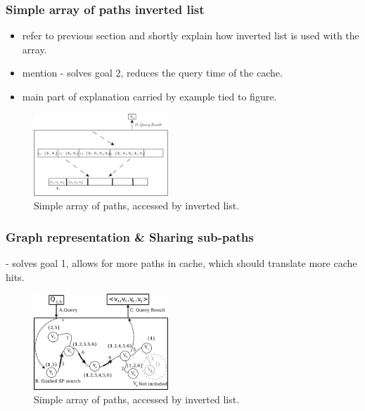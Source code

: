 \subsubsection{Simple array of paths inverted list}

\begin{itemize}
\item refer to previous section and shortly explain how inverted list is used with the array.
\item mention  - solves goal 2, reduces the query time of the cache.
\item main part of explanation carried by example tied to figure.
\end{itemize}

\begin{figure}[hbt]
  \center
        \includegraphics[width=0.45\textwidth]{figures/cachearrayinvertlist.pdf}
        \caption{Simple array of paths, accessed by inverted list.}
  \label{fig:cacheinvertlist}
\end{figure}


\subsubsection{Graph representation \& Sharing sub-paths} - solves goal 1, allows for more paths in cache, which should translate more cache hits.

\begin{figure}[hbt]
  \center
        \includegraphics[width=0.45\textwidth]{figures/cachegraph}
        \caption{Simple array of paths, accessed by inverted list.}
  \label{fig:cachegraph}
\end{figure}

